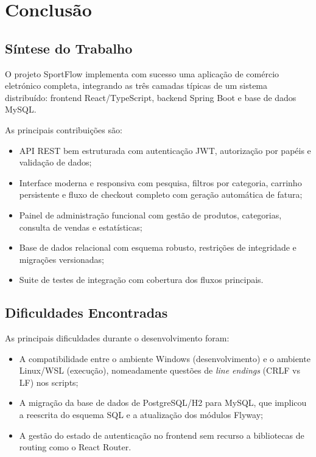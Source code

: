 \section{Conclusão}
\label{sec:conc}

\subsection{Síntese do Trabalho}

O projeto SportFlow implementa com sucesso uma aplicação de comércio eletrónico completa, integrando as três camadas típicas de um sistema distribuído: frontend React/TypeScript, backend Spring Boot e base de dados MySQL.

As principais contribuições são:

\begin{itemize}
    \item API REST bem estruturada com autenticação JWT, autorização por papéis e validação de dados;
    \item Interface moderna e responsiva com pesquisa, filtros por categoria, carrinho persistente e fluxo de checkout completo com geração automática de fatura;
    \item Painel de administração funcional com gestão de produtos, categorias, consulta de vendas e estatísticas;
    \item Base de dados relacional com esquema robusto, restrições de integridade e migrações versionadas;
    \item Suite de testes de integração com cobertura dos fluxos principais.
\end{itemize}

\subsection{Dificuldades Encontradas}

As principais dificuldades durante o desenvolvimento foram:

\begin{itemize}
    \item A compatibilidade entre o ambiente Windows (desenvolvimento) e o ambiente Linux/WSL (execução), nomeadamente questões de \textit{line endings} (CRLF vs LF) nos scripts;
    \item A migração da base de dados de PostgreSQL/H2 para MySQL, que implicou a reescrita do esquema SQL e a atualização dos módulos Flyway;
    \item A gestão do estado de autenticação no frontend sem recurso a bibliotecas de routing como o React Router.
\end{itemize}

